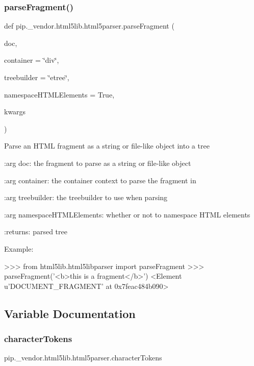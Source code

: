 \subsubsection{\texorpdfstring{parse\+Fragment()}{parseFragment()}}
{\footnotesize\ttfamily def pip.\+\_\+vendor.\+html5lib.\+html5parser.\+parse\+Fragment (\begin{DoxyParamCaption}\item[{}]{doc,  }\item[{}]{container = {\ttfamily \char`\"{}div\char`\"{}},  }\item[{}]{treebuilder = {\ttfamily \char`\"{}etree\char`\"{}},  }\item[{}]{namespace\+H\+T\+M\+L\+Elements = {\ttfamily True},  }\item[{}]{kwargs }\end{DoxyParamCaption})}

\begin{DoxyVerb}Parse an HTML fragment as a string or file-like object into a tree

:arg doc: the fragment to parse as a string or file-like object

:arg container: the container context to parse the fragment in

:arg treebuilder: the treebuilder to use when parsing

:arg namespaceHTMLElements: whether or not to namespace HTML elements

:returns: parsed tree

Example:

>>> from html5lib.html5libparser import parseFragment
>>> parseFragment('<b>this is a fragment</b>')
<Element u'DOCUMENT_FRAGMENT' at 0x7feac484b090>\end{DoxyVerb}
 

\subsection{Variable Documentation}
\mbox{\label{namespacepip_1_1__vendor_1_1html5lib_1_1html5parser_aa04126a7b723997216e34603814f185b}} 
\subsubsection{\texorpdfstring{character\+Tokens}{characterTokens}}
{\footnotesize\ttfamily pip.\+\_\+vendor.\+html5lib.\+html5parser.\+character\+Tokens}

